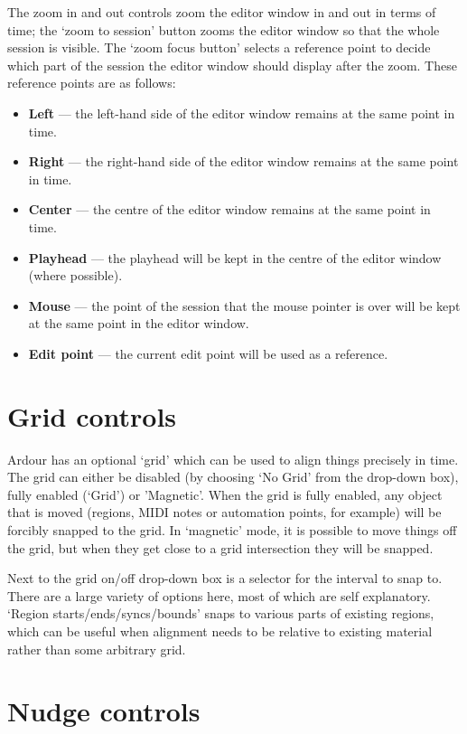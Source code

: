 \documentclass[10pt,a4paper]{book}
\begin{document}
The zoom in and out controls zoom the editor window in and out in
terms of time; the `zoom to session' button zooms the editor window so
that the whole session is visible.  The `zoom focus button' selects
a reference point to decide which part of the session the editor window
should display after the zoom.  These reference points are as follows:
\begin{itemize}
\item \textbf{Left} --- the left-hand side of the editor window
  remains at the same point in time.
\item \textbf{Right} --- the right-hand side of the editor window
  remains at the same point in time.
\item \textbf{Center} --- the centre of the editor window
  remains at the same point in time.
\item \textbf{Playhead} --- the playhead will be kept in the centre of
  the editor window (where possible).
\item \textbf{Mouse} --- the point of the session that the mouse
  pointer is over will be kept at the same point in the editor window.
\item \textbf{Edit point} --- the current edit point will be used as a reference.
\end{itemize}

\section{Grid controls}

Ardour has an optional `grid' which can be used to align things
precisely in time.  The grid can either be disabled (by choosing `No
Grid' from the drop-down box), fully enabled (`Grid') or 'Magnetic'.
When the grid is fully enabled, any object that is moved (regions,
MIDI notes or automation points, for example) will be forcibly snapped
to the grid.  In `magnetic' mode, it is possible to move things off
the grid, but when they get close to a grid intersection they will be
snapped.

Next to the grid on/off drop-down box is a selector for the interval
to snap to.  There are a large variety of options here, most of which
are self explanatory.  `Region starts/ends/syncs/bounds' snaps to
various parts of existing regions, which can be useful when alignment
needs to be relative to existing material rather than some arbitrary
grid.

\section{Nudge controls}
\end{document}

